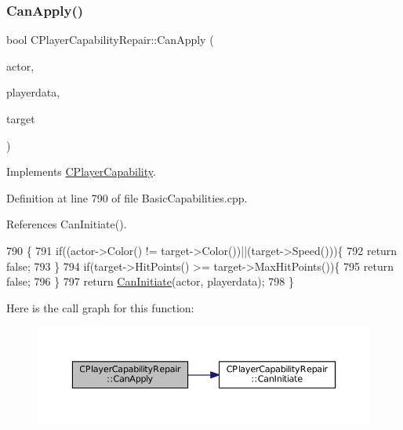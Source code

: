 \subsubsection{\texorpdfstring{Can\+Apply()}{CanApply()}}
{\footnotesize\ttfamily bool C\+Player\+Capability\+Repair\+::\+Can\+Apply (\begin{DoxyParamCaption}\item[{std\+::shared\+\_\+ptr$<$ \hyperlink{classCPlayerAsset}{C\+Player\+Asset} $>$}]{actor,  }\item[{std\+::shared\+\_\+ptr$<$ \hyperlink{classCPlayerData}{C\+Player\+Data} $>$}]{playerdata,  }\item[{std\+::shared\+\_\+ptr$<$ \hyperlink{classCPlayerAsset}{C\+Player\+Asset} $>$}]{target }\end{DoxyParamCaption})\hspace{0.3cm}{\ttfamily [virtual]}}



Implements \hyperlink{classCPlayerCapability_ae96263e0950f496492f8baeb877b9554}{C\+Player\+Capability}.



Definition at line 790 of file Basic\+Capabilities.\+cpp.



References Can\+Initiate().


\begin{DoxyCode}
790                                                                                                            
                                                   \{
791     \textcolor{keywordflow}{if}((actor->Color() != target->Color())||(target->Speed()))\{
792         \textcolor{keywordflow}{return} \textcolor{keyword}{false};   
793     \}
794     \textcolor{keywordflow}{if}(target->HitPoints() >= target->MaxHitPoints())\{
795         \textcolor{keywordflow}{return} \textcolor{keyword}{false};   
796     \}
797     \textcolor{keywordflow}{return} \hyperlink{classCPlayerCapabilityRepair_a579761cab74d447b95856a24a7841b2e}{CanInitiate}(actor, playerdata);
798 \}
\end{DoxyCode}
Here is the call graph for this function\+:\nopagebreak
\begin{figure}[H]
\begin{center}
\leavevmode
\includegraphics[width=350pt]{classCPlayerCapabilityRepair_ae989c67c5e14bbba5b2ddda993ee635a_cgraph}
\end{center}
\end{figure}
\hypertarget{classCPlayerCapabilityRepair_a579761cab74d447b95856a24a7841b2e}{}\label{classCPlayerCapabilityRepair_a579761cab74d447b95856a24a7841b2e} 
